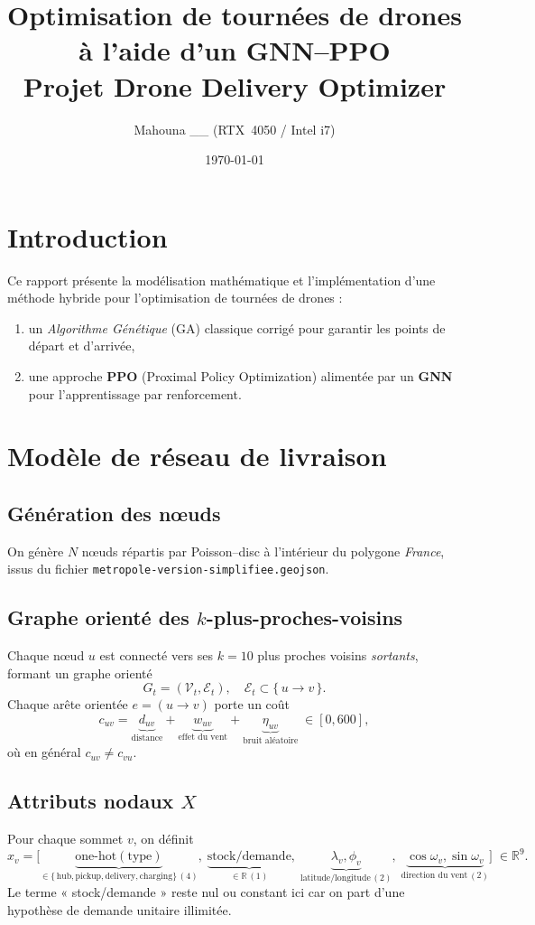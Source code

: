 \documentclass[11pt,a4paper]{article}
\title{\texorpdfstring{Optimisation de tournées de drones à l'aide d'un GNN--PPO\\\small Projet Drone Delivery Optimizer}{Optimisation de tournées de drones à l'aide d'un GNN-PPO - Projet Drone Delivery Optimizer}}
\author{\texorpdfstring{\small Mahouna \_\_ \quad (RTX~4050 / Intel i7)}{Mahouna __ (RTX 4050 / Intel i7)}}
\date{\today}
\newcommand{\R}{\mathbb{R}}
\begin{document}
\maketitle
\tableofcontents
\newpage

\section{Introduction}
Ce rapport présente la modélisation mathématique et l'implémentation d'une méthode hybride pour l'optimisation de tournées de drones : 
\begin{enumerate}
  \item un \emph{Algorithme Génétique} (GA) classique corrigé pour garantir les points de départ et d'arrivée,
  \item une approche \textbf{PPO} (Proximal Policy Optimization) alimentée par un \textbf{GNN} pour l'apprentissage par renforcement.
\end{enumerate}

\section{Modèle de réseau de livraison}
\subsection{Génération des nœuds}
On génère \(N\) nœuds répartis par Poisson–disc à l'intérieur du polygone \emph{France}, issus du fichier \texttt{metropole-version-simplifiee.geojson}.

\subsection{Graphe orienté des \texorpdfstring{\(k\)}{k}-plus-proches-voisins}
Chaque nœud \(u\) est connecté vers ses \(k=10\) plus proches voisins \emph{sortants}, formant un graphe orienté 
\[
  G_t = (\mathcal{V}_t,\mathcal{E}_t),\quad \mathcal{E}_t\subset \{\,u\to v\,\}.
\]
Chaque arête orientée \(e=(u\!\to\!v)\) porte un coût 
\[
  c_{uv}
  = \underbrace{d_{uv}}_{\text{distance}}
  + \underbrace{w_{uv}}_{\text{effet du vent}}
  + \underbrace{\eta_{uv}}_{\text{bruit aléatoire}}
  \;\in[0,600],
\]
où en général \(c_{uv}\neq c_{vu}\).

\subsection{Attributs nodaux \texorpdfstring{\(X\)}{X}}
Pour chaque sommet \(v\), on définit
\[
  x_v = \bigl[
    \underbrace{\text{one-hot}(\text{type})}_{\in\{\,\text{hub},\text{pickup},\text{delivery},\text{charging}\}\, (4)},
    \;
    \underbrace{\text{stock/demande}}_{\in\R\, (1)},
    \;
    \underbrace{\lambda_v,\phi_v}_{\text{latitude/longitude}\,(2)},
    \;
    \underbrace{\cos\omega_v,\sin\omega_v}_{\text{direction du vent}\,(2)}
  \bigr]\;\in\R^{9}.
\]
Le terme « stock/demande » reste nul ou constant ici car on part d'une hypothèse de demande unitaire illimitée.
\end{document}
